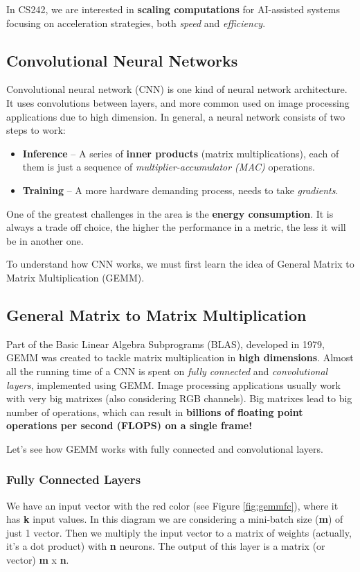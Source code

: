 \documentclass[abstract=true]{scrartcl}
\begin{document}
In CS242, we are interested in \textbf{scaling computations} for AI-assisted systems focusing on acceleration strategies, both \emph{speed} and \emph{efficiency}.

\subsection{Convolutional Neural Networks}

Convolutional neural network (CNN) \citep{lecun98} is one kind of neural network architecture. It uses convolutions between layers, and more common used on image processing applications due to high dimension.
In general, a neural network consists of two steps to work:

\begin{itemize}
    \item \textbf{Inference} -- A series of \textbf{inner products} (matrix multiplications), each of them is just a sequence of \emph{multiplier-accumulator (MAC)} operations.
    \item \textbf{Training} -- A more hardware demanding process, needs to take \emph{gradients}.
\end{itemize}

One of the greatest challenges in the area is the \textbf{energy consumption}. It is always a trade off choice, the higher the performance in a metric, the less it will be in another one.

To understand how CNN works, we must first learn the idea of General Matrix to Matrix Multiplication (GEMM).

\subsection{General Matrix to Matrix Multiplication}
Part of the Basic Linear Algebra Subprograms (BLAS), developed in 1979, GEMM was created to tackle matrix multiplication in \textbf{high dimensions}.
Almost all the running time of a CNN is spent on \emph{fully connected} and \emph{convolutional layers}, implemented using GEMM. Image processing applications usually work with very big matrixes (also considering RGB channels).
Big matrixes lead to big number of operations, which can result in \textbf{billions of floating point operations per second (FLOPS) on a single frame!}

Let's see how GEMM works with fully connected and convolutional layers.

\subsubsection{Fully Connected Layers}
We have an input vector with the red color (see Figure \ref{fig:gemmfc}), where it has \textbf{k} input values. In this diagram we are considering a mini-batch size (\textbf{m}) of just 1 vector.
Then we multiply the input vector to a matrix of weights (actually, it's a dot product) with \textbf{n} neurons. The output of this layer is a matrix (or vector) \textbf{m} x \textbf{n}.
\end{document}
